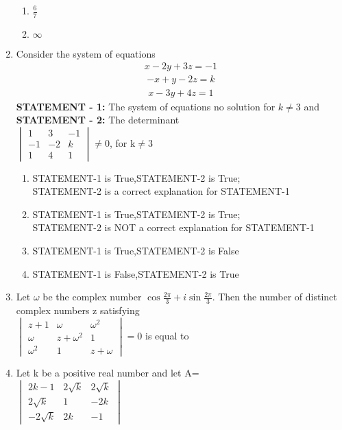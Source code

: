 \begin{enumerate}[label=\arabic*.,ref=\thesubsection.\theenumi]
\begin{enumerate}
 \item $\frac{6}{7}$
 \item $\infty$
\end{enumerate}
\item Consider the system of equations 
\begin{align}
 x-2y+3z=-1
 \end{align}  
 \begin{align}
  -x+y-2z=k
  \end{align}  
  \begin{align}
   x-3y+4z=1
   \end{align}
\textbf {STATEMENT - 1:} The system of equations no solution for $k\neq3$ and\\
\textbf {STATEMENT - 2:} The determinant \\
$\begin{vmatrix} 1 & 3 & -1 \\ -1 & -2 & k \\ 1 & 4 & 1 \end{vmatrix}$$\neq0$, for k$\neq3$
\begin{enumerate}
 \item STATEMENT-1 is True,STATEMENT-2 is True; \\
       STATEMENT-2 is a correct explanation for STATEMENT-1
 \item STATEMENT-1 is True,STATEMENT-2 is True; \\
       STATEMENT-2 is NOT a correct explanation for STATEMENT-1
 \item STATEMENT-1 is True,STATEMENT-2 is False
 \item STATEMENT-1 is False,STATEMENT-2 is True
\end{enumerate}
\item Let $\omega$ be the complex number $\cos\frac{2\pi}{3}+i\sin\frac{2\pi}{3}$. Then the number of distinct complex numbers z satisfying \\
$\begin{vmatrix} z+1 & \omega & \omega^2 \\ \omega &z+\omega^2  & 1 \\ \omega^2 &  1 & z+\omega \end{vmatrix}=0$ is equal to
\item Let k be a positive real number and let A=\\
$\begin{vmatrix} 2k-1 & 2\sqrt k & 2\sqrt k \\ 2\sqrt k & 1  & -2k \\ -2\sqrt k &  2k & -1\end{vmatrix}$
$$
\end{enumerate}
